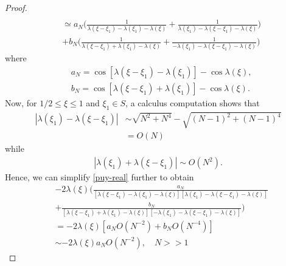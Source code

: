 \documentclass[12pt,reqno]{amsart}
\numberwithin{equation}{section}  %
\begin{document}
\begin{proof}
\begin{equation}
\begin{split}
  \\
  & \simeq a_{N} \bigg ( \frac{1}{\lambda(\xi - \xi_{1}) - \lambda(\xi_{1}) - \lambda(\xi)} + \frac{1}{\lambda(\xi_{1}) - \lambda(\xi - \xi_{1}) - \lambda(\xi)} \bigg )
  \\
  & + b_{N} \bigg ( \frac{1}{\lambda(\xi - \xi_{1}) + \lambda(\xi_{1}) - \lambda(\xi)} + \frac{1}{-\lambda(\xi_{1}) - \lambda(\xi - \xi_{1}) - \lambda(\xi)} 
  \bigg ) 
\end{split}
\end{equation}
where
%
%
\begin{equation*}
\begin{split}
  & a_{N} =   \cos[\lambda(\xi - \xi_{1}) - \lambda(\xi_{1})] - \cos \lambda(\xi),
  \\
  & b_{N} =  \cos[\lambda(\xi - \xi_{1}) + \lambda(\xi_{1})] - \cos \lambda(\xi).
\end{split}
\end{equation*}
Now, for $1/2 \le \xi \le 1$ and $\xi_{1} \in S$, a calculus computation shows that
%
%
\begin{equation*}
\begin{split}
|\lambda(\xi_{1}) - \lambda(\xi - \xi_{1})|
 & \sim \sqrt{N^{2} + N^{4}} - \sqrt{(N-1)^{2} + (N-1)^{4}} 
 \\
 & = O(N)
\end{split}
\end{equation*}
%
%
while
%
%
\begin{equation*}
\begin{split}
  |\lambda(\xi_{1}) + \lambda(\xi - \xi_{1})| \sim O(N^{2}).
\end{split}
\end{equation*}
Hence, we can simplify \eqref{puy-real} further to obtain
%
%
\begin{equation*}
\begin{split}
  & -2 \lambda(\xi) \bigg (  \frac{a_{N}}{[\lambda(\xi - \xi_{1}) - \lambda(\xi_{1}) - \lambda(\xi)][\lambda(\xi_{1}) - \lambda(\xi - \xi_{1}) - \lambda(\xi)]} 
  \\
  & +  \frac{b_{N}}{[\lambda(\xi - \xi_{1}) + \lambda(\xi_{1}) - \lambda(\xi)][-\lambda(\xi_{1}) - \lambda(\xi - \xi_{1}) - \lambda(\xi)]} 
   \bigg )
   \\
   & = -2 \lambda(\xi) \left [ a_{N} O(N^{-2}) + b_{N} O(N^{-4})  \right ]
   \\
   & \sim  -2 \lambda(\xi) a_{N} O(N^{-2}), \quad N > >1
\end{split}
\end{equation*}

\end{proof}
\end{document}
